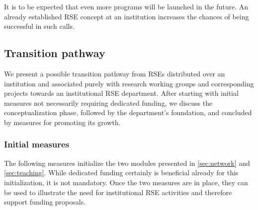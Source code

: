 \documentclass[a4paper]{article}
\begin{document}
\begin{enumerate}
      It is to be expected that even more programs will be launched in the future.
      An already established RSE concept at an institution increases the chances of being successful in such calls.
\end{enumerate}


\subsection{Transition pathway}

We present a possible transition pathway from RSEs distributed over an institution and associated purely with research working groups and corresponding projects towards an institutional RSE department.
After starting with initial measures not necessarily requiring dedicated funding, we discuss the conceptualization phase, followed by the department's foundation, and concluded by measures for promoting its growth.

\subsubsection{Initial measures}
The following measures initialize the two modules presented in \autoref{sec:network} and \autoref{sec:teaching}.
While dedicated funding certainly is beneficial already for this initialization, it is not mandatory.
Once the two measures are in place, they can be used to illustrate the need for institutional RSE activities and therefore support funding proposals.
\end{document}
